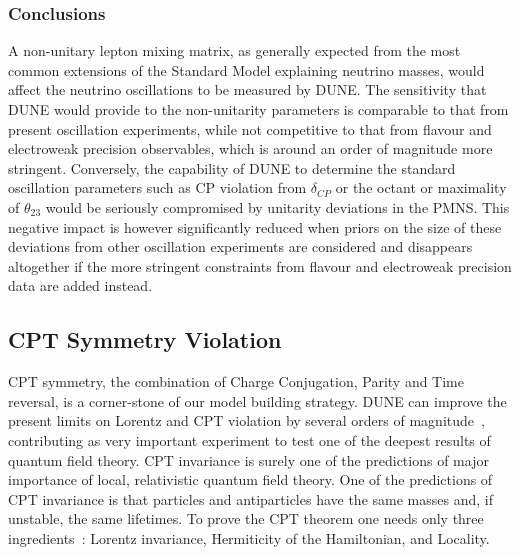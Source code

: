 \subsubsection{Conclusions}
A non-unitary lepton mixing matrix, as generally expected from the most common extensions of the Standard Model explaining neutrino masses, would affect the neutrino oscillations to be measured by DUNE. The sensitivity that DUNE would provide to the non-unitarity parameters is comparable to that from present oscillation experiments, while not competitive to that from flavour and electroweak precision observables, which is around an order of magnitude more stringent. Conversely, the capability of DUNE to determine the standard oscillation parameters such as CP violation from $\delta_{CP}$ or the octant or maximality of $\theta_{23}$ would be seriously compromised by unitarity deviations in the PMNS. This negative impact is however significantly reduced when priors on the size of these deviations from other oscillation experiments are considered and disappears altogether if the more stringent constraints from flavour and electroweak precision data are added instead.

\subsection{CPT Symmetry Violation}
CPT symmetry, the combination of Charge Conjugation, Parity and Time reversal, is a corner-stone of our model building strategy.
DUNE can improve the present limits on Lorentz and CPT violation by several orders of magnitude~\cite{Streater:1989vi,Barenboim:2002tz,Kostelecky:2003cr,Diaz:2009qk,Kostelecky:2011gq,Barenboim:2017ewj}, contributing as very important experiment to test one of the deepest results of quantum field theory.
%
CPT invariance is surely one of the predictions of major importance of local, relativistic quantum field theory. One of the predictions of CPT invariance is that particles and antiparticles have the same masses and, if unstable, the same lifetimes. To prove the CPT theorem one needs only three ingredients~\cite{Streater:1989vi}: Lorentz invariance, Hermiticity of the Hamiltonian, and Locality.
%

